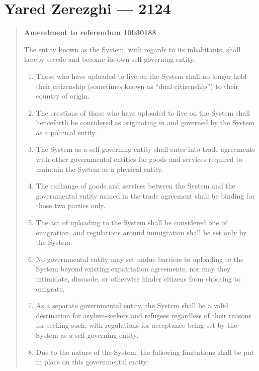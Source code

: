 \hypertarget{yared-zerezghi-2124}{%
\chapter{Yared Zerezghi — 2124}\label{yared-zerezghi-2124}}

\begin{quote}
\textbf{Amendment to referendum 10b30188}

The entity known as the System, with regards to its inhabitants, shall hereby secede and become its own self-governing entity.

\begin{enumerate}
\def\labelenumi{\arabic{enumi}.}
\tightlist
\item
  Those who have uploaded to live on the System shall no longer hold their citizenship (sometimes known as ``dual citizenship'') to their country of origin.
\item
  The creations of those who have uploaded to live on the System shall henceforth be considered as originating in and governed by the System as a political entity.
\item
  The System as a self-governing entity shall enter into trade agreements with other governmental entities for goods and services required to maintain the System as a physical entity.
\item
  The exchange of goods and services between the System and the governmental entity named in the trade agreement shall be binding for those two parties only.
\item
  The act of uploading to the System shall be considered one of emigration, and regulations around immigration shall be set only by the System.
\item
  No governmental entity may set undue barriers to uploading to the System beyond existing expatriation agreements, nor may they intimidate, dissuade, or otherwise hinder citizens from choosing to emigrate.
\item
  As a separate governmental entity, the System shall be a valid destination for asylum-seekers and refugees regardless of their reasons for seeking such, with regulations for acceptance being set by the System as a self-governing entity.
\item
  Due to the nature of the System, the following limitations shall be put in place on this governmental entity:


\end{enumerate}
\end{quote}
